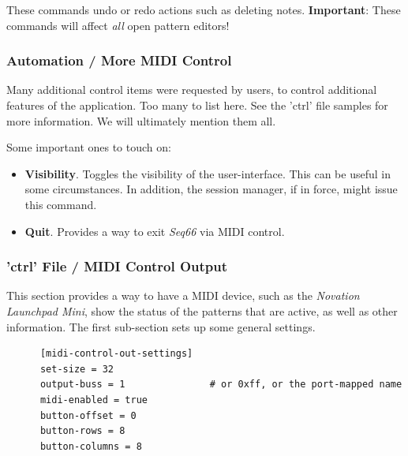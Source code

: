    These commands undo or redo actions such as deleting notes.
   \textbf{Important}:
   These commands will affect \textsl{all} open pattern editors!

\subsubsection{Automation / More MIDI Control}
\label{subsubsec:configuration_midi_ctrl_automationex}

   Many additional control items were requested by users, to control
   additional features of the application.  Too many to list here.
   See the 'ctrl' file samples for more information.
   We will ultimately mention them all.

   Some important ones to touch on:

   \begin{itemize}
      \item \textbf{Visibility}.
         Toggles the visibility of the user-interface.
         This can be useful in some circumstances.
         In addition, the session manager, if in force, might
         issue this command.
      \item \textbf{Quit}.
         Provides a way to exit \textsl{Seq66} via MIDI control.
   \end{itemize}

\subsubsection{'ctrl' File / MIDI Control Output}
\label{subsubsec:configuration_ctrl_midi_control_out}

   This section provides a way to have a MIDI device, such as the
   \textsl{Novation Launchpad Mini}, show the status
   of the patterns that are active, as well as other information.
   The first sub-section sets up some general settings.

   \begin{verbatim}
      [midi-control-out-settings]
      set-size = 32
      output-buss = 1               # or 0xff, or the port-mapped name
      midi-enabled = true
      button-offset = 0
      button-rows = 8
      button-columns = 8
   \end{verbatim}

